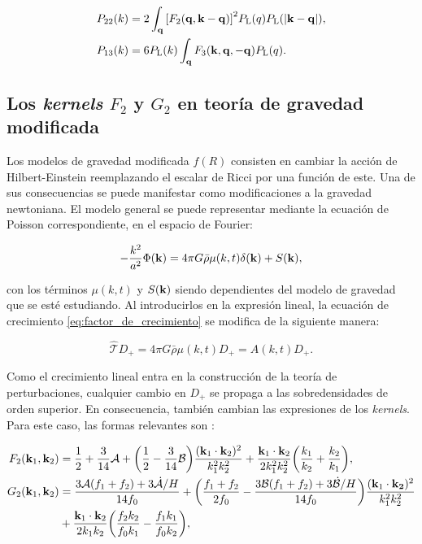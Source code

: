 \documentclass[letterpaper, 12pt]{article}
\begin{document}
            
            \begin{align}
                P_{22}(k) &= 2\int_{\vb{q}} \qty[F_2(\vb{q},\vb{k}-\vb{q})]^2 P_{\mathrm{L}}(q)P_{\mathrm{L}}(\abs{\vb{k}-\vb{q}}), \\
                P_{13}(k) &= 6P_{\mathrm{L}}(k)\int_{\vb{q}} F_3(\vb{k},\vb{q},-\vb{q})P_{\mathrm{L}}(q).
            \end{align}
            
        \subsection{\texorpdfstring{Los \emph{kernels} $F_2$ y $G_2$ en teoría de gravedad modificada}{Los kernels F2 y G2 en teoría de gravedad modificada}}
            Los modelos de gravedad modificada $f(R)$ consisten en cambiar la acción de Hilbert-Einstein reemplazando el escalar de Ricci por una función de este. Una de sus consecuencias se puede manifestar como modificaciones a la gravedad newtoniana. El modelo general se puede representar mediante la ecuación de Poisson correspondiente, en el espacio de Fourier:

            
            \begin{equation}
                -\frac{k^2}{a^2}\Phi(\vb{k}) = 4\pi G\bar{\rho}\mu(k,t)\delta(\vb{k}) + S(\vb{k}),
            \end{equation}
            
            con los términos $\mu(k,t)$ y $S(\vb{k})$ siendo dependientes del modelo de gravedad que se esté estudiando. Al introducirlos en la expresión lineal, la ecuación de crecimiento \ref{eq:factor_de_crecimiento} se modifica de la siguiente manera:
            
            \begin{equation}\label{eq:crecimiento_no-lineal}
                \hat{\mathcal{T}}D_+ = 4\pi G\bar{\rho}\mu(k,t)D_+ = A(k,t)D_+.
            \end{equation}

            Como el crecimiento lineal entra en la construcción de la teoría de perturbaciones, cualquier cambio en $D_+$ se propaga a las sobredensidades de orden superior. En consecuencia, también cambian las expresiones de los \emph{kernels}. Para este caso, las formas relevantes son \cite{1}:
            
            \begin{align}
                F_2(\vb{k}_1,\vb{k}_2) &= \frac12 + \frac{3}{14}\mathcal{A}
                + \qty(\frac{1}{2}-\frac{3}{14}\mathcal{B})\frac{(\vb{k}_1\cdot \vb{k}_2)^2}{k_1^2k_2^{2}}
                + \frac{\vb{k}_1\cdot \vb{k}_2}{2k_1^2 k_2^2}\qty(\frac{k_1}{k_2}+\frac{k_2}{k_1}), \\ 
                G_2(\vb{k}_1,\vb{k}_2) &=\frac{3\mathcal{A}(f_1+f_2)+3\dot{\mathcal{A}}/H}{14f_0}
                + \qty(\frac{f_1+f_2}{2f_0}-\frac{3\mathcal{B}(f_1+f_2)+3\dot{\mathcal{B}}/H}{14f_0})\frac{(\vb{k}_1 \cdot \vb{k_2})^2}{k_1^2k_2^2} \nonumber\\
                & + \frac{\vb{k}_1\cdot \vb{k}_2}{2k_1k_2}\qty(\frac{f_2 k_2}{f_0 k_1}-\frac{f_1 k_1}{f_0 k_2}),
            \end{align}
            
\end{document}
